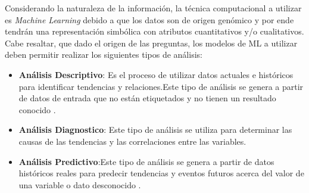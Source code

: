 Considerando la naturaleza de la información, la técnica computacional a utilizar es \textit{Machine Learning} debido a que los datos son de origen genómico y por ende tendrán una representación simbólica con atributos cuantitativos y/o cualitativos. Cabe resaltar, que dado el origen de las preguntas, los modelos de ML a utilizar deben permitir realizar los siguientes tipos de análisis:

\begin{itemize}[label=\HandRight]
	\item \textbf{Análisis Descriptivo}:
	 Es el proceso de utilizar datos actuales e históricos para identificar tendencias y relaciones.Este tipo de análisis se genera a partir de datos de entrada que no están etiquetados y no tienen un resultado conocido \cite{JorgeCalvo2020}.
	
	\item \textbf{Análisis Diagnostico}:
	Este tipo de análisis se utiliza para determinar las causas de las tendencias y las correlaciones entre las variables\cite{JorgeCalvo2020}.
	
	\item \textbf{Análisis Predictivo}:Este tipo de análisis se genera a partir de datos históricos reales para predecir tendencias y eventos futuros acerca del valor de una variable o dato desconocido \cite{JorgeCalvo2020}.
\end{itemize}

